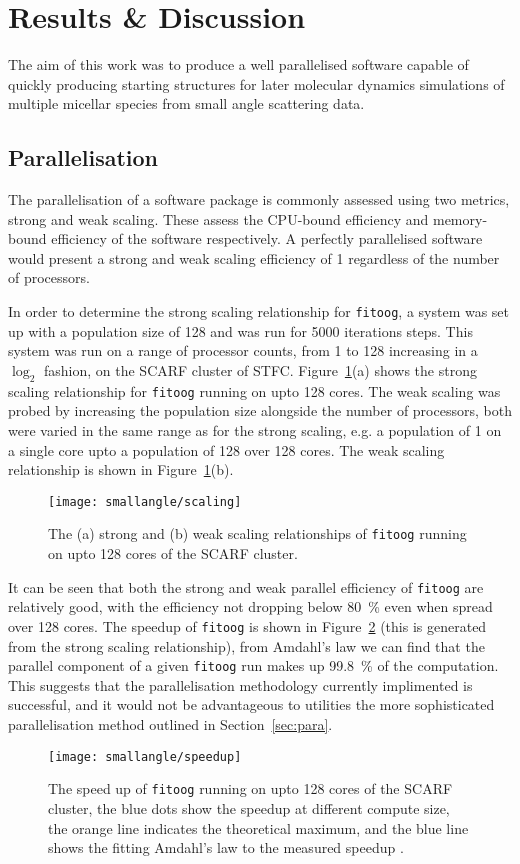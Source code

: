 \section{Results \& Discussion}
The aim of this work was to produce a well parallelised software capable of quickly producing starting structures for later molecular dynamics simulations of multiple micellar species from small angle scattering data.

\subsection{Parallelisation}
The parallelisation of a software package is commonly assessed using two metrics, strong and weak scaling.
These assess the CPU-bound efficiency and memory-bound efficiency of the software respectively.
A perfectly parallelised software would present a strong and weak scaling efficiency of 1 regardless of the number of processors.

In order to determine the strong scaling relationship for \texttt{fitoog}, a system was set up with a population size of 128 and was run for 5000 iterations steps.
This system was run on a range of processor counts, from 1 to 128 increasing in a $\log_2$ fashion, on the SCARF cluster of STFC.
Figure~\ref{fig:scale}(a) shows the strong scaling relationship for \texttt{fitoog} running on upto 128 cores.
The weak scaling was probed by increasing the population size alongside the number of processors, both were varied in the same range as for the strong scaling, e.g. a population of 1 on a single core upto a population of 128 over 128 cores.
The weak scaling relationship is shown in Figure~\ref{fig:scale}(b).
%
\begin{figure}
    \centering
    \texttt{[image: smallangle/scaling]}
    \caption{The (a) strong and (b) weak scaling relationships of \texttt{fitoog} running on upto 128 cores of the SCARF cluster.}
    \label{fig:scale}
\end{figure}
%

It can be seen that both the strong and weak parallel efficiency of \texttt{fitoog} are relatively good, with the efficiency not dropping below \SI{80}{\percent} even when spread over 128 cores.
The speedup of \texttt{fitoog} is shown in Figure~\ref{fig:speedup} (this is generated from the strong scaling relationship), from Amdahl's law \cite{amdahl_validity_1967} we can find that the parallel component of a given \texttt{fitoog} run makes up \SI{99.8}{\percent} of the computation.
This suggests that the parallelisation methodology currently implimented is successful, and it would not be advantageous to utilities the more sophisticated parallelisation method outlined in Section~\ref{sec:para}.
%
\begin{figure}
    \centering
    \texttt{[image: smallangle/speedup]}
    \caption{The speed up of \texttt{fitoog} running on upto 128 cores of the SCARF cluster, the blue dots show the speedup at different compute size, the orange line indicates the theoretical maximum, and the blue line shows the fitting Amdahl's law to the measured speedup \cite{amdahl_validity_1967}.}
    \label{fig:speedup}
\end{figure}
%


